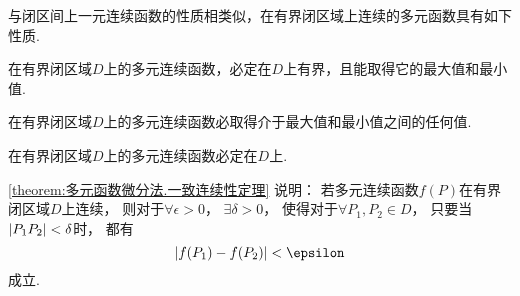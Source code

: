 与闭区间上一元连续函数的性质相类似，在有界闭区域上连续的多元函数具有如下性质.

\begin{property}[有界性与最值定理]\label{theorem:多元函数微分法.有界性与最值定理}
在有界闭区域\(D\)上的多元连续函数，必定在\(D\)上有界，且能取得它的最大值和最小值.
\end{property}

\begin{property}[介值定理]\label{theorem:多元函数微分法.介值定理}
在有界闭区域\(D\)上的多元连续函数必取得介于最大值和最小值之间的任何值.
\end{property}

\begin{property}[一致连续性定理]\label{theorem:多元函数微分法.一致连续性定理}
在有界闭区域\(D\)上的多元连续函数必定在\(D\)上.
\end{property}
\cref{theorem:多元函数微分法.一致连续性定理} 说明：
若多元连续函数\(f(P)\)在有界闭区域\(D\)上连续，
则对于\(\forall \epsilon > 0\)，
\(\exists \delta > 0\)，
使得对于\(\forall P_1,P_2 \in D\)，
只要当\(\abs{P_1P_2}<\delta\)时，
都有\[
	\abs{f(P_1)-f(P_2)} < \epsilon
\]成立.

